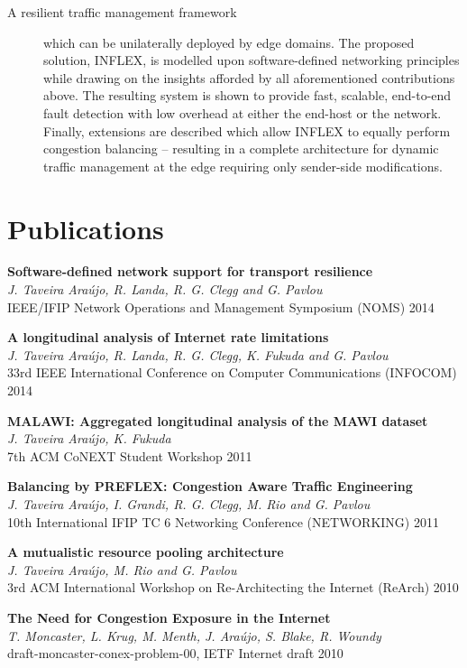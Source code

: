 \begin{description}
\item[A resilient traffic management framework] which can be unilaterally deployed by edge domains.
The proposed solution, INFLEX, is modelled upon software-defined networking principles while drawing on the insights afforded by all aforementioned contributions above.
The resulting system is shown to provide fast, scalable, end-to-end fault detection with low overhead at either the end-host or the network.
Finally, extensions are described which allow INFLEX to equally perform congestion balancing -- resulting in a complete architecture for dynamic traffic management at the edge requiring only sender-side modifications.
\end{description}


\newcommand{\publication}[3] {
    \item \textbf{#1} \\ \emph{#2} \\ #3
}

\section{Publications}
\label{sec:introduction:contributions}

\begin{description}

\publication{Software-defined network support for transport resilience}
            {J. Taveira Ara\'{u}jo, R. Landa, R. G. Clegg and G. Pavlou}
            {IEEE/IFIP Network Operations and Management Symposium (NOMS) 2014}

\publication{A longitudinal analysis of Internet rate limitations}
            {J. Taveira Ara\'{u}jo, R. Landa, R. G. Clegg, K. Fukuda and G. Pavlou}
            {33rd IEEE International Conference on Computer Communications (INFOCOM) 2014}

\publication{MALAWI: Aggregated longitudinal analysis of the MAWI dataset}
            {J. Taveira Ara\'{u}jo, K. Fukuda}
            {7th ACM CoNEXT Student Workshop 2011}

\publication{Balancing by PREFLEX: Congestion Aware Traffic Engineering}
            {J. Taveira Ara\'{u}jo, I. Grandi, R. G. Clegg, M. Rio and G. Pavlou}
            {10th International IFIP TC 6 Networking Conference (NETWORKING) 2011}

\publication{A mutualistic resource pooling architecture}
            {J. Taveira Ara\'{u}jo, M. Rio and G. Pavlou}
            {3rd ACM International Workshop on Re-Architecting the Internet (ReArch) 2010}

\publication{The Need for Congestion Exposure in the Internet}
            {T. Moncaster, L. Krug, M. Menth, J. Ara\'{u}jo, S. Blake, R. Woundy}
            {draft-moncaster-conex-problem-00, IETF Internet draft 2010}
\end{description}

